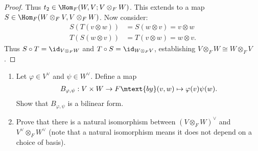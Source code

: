 \documentclass[10pt,twoside,openany]{memoir}
\begin{document}
\begin{proof}
            Thus $t_2 \in \Hom_F(W,V;V \otimes_F W)$. This extends to a map $S \in \Hom_F(W \otimes_F V, V \otimes_F W)$. Now consider:
                \begin{equation*}
                \begin{split}
                    S(T(v \otimes w)) &= S(w \otimes v) = v \otimes w \\
                    T(S(w \otimes v)) &= T(v \otimes w) = w \otimes v.
                \end{split}
                \end{equation*}
            Thus $S \circ T = \id_{V \otimes_F W}$ and $T \circ S = \id_{W \otimes_F V}$, establishing $V \otimes_F W \cong W \otimes_F V$.
        \end{proof}
    \begin{exercise}
        \phantom{a}
        \begin{enumerate}[label = (\alph*)]
            \item Let $\varphi \in V^\vee$ and $\psi \in W^\vee$. Define a map
                \begin{equation*}
                \begin{split}
                    B_{\varphi,\psi}: V \times W \rightarrow F \mtext{by} (v,w) \mapsto \varphi(v)\psi(w).
                \end{split}
                \end{equation*}
            Show that $B_{\varphi,\psi}$ is a bilinear form.
            \item Prove that there is a natural isomorphism between $(V \otimes_F W)^\vee$ and $V^\vee \otimes_F W^\vee$ (note that a natural isomorphism means it does not depend on a choice of basis).
        \end{enumerate}
    \end{exercise}
\end{document}
